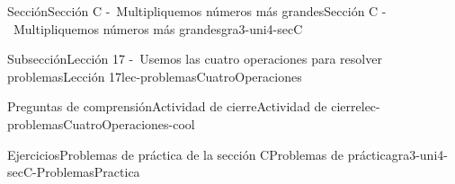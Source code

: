 \begin{sectionptx}{Sección}{Sección C -~Multipliquemos números más grandes}{}{Sección C -~Multipliquemos números más grandes}{}{}{gra3-uni4-secC}
\begin{subsectionptx}{Subsección}{Lección 17 -~Usemos las cuatro operaciones para resolver problemas}{}{Lección 17}{}{}{lec-problemasCuatroOperaciones}
%
%
\typeout{************************************************}
\typeout{************************************************}
%
\begin{reading-questions-subsubsection-numberless}{Preguntas de comprensión}{Actividad de cierre}{}{Actividad de cierre}{}{}{lec-problemasCuatroOperaciones-cool}
%
\end{reading-questions-subsubsection-numberless}
\end{subsectionptx}
%
%
\typeout{************************************************}
\typeout{************************************************}
%
\begin{exercises-subsection}{Ejercicios}{Problemas de práctica de la sección C}{}{Problemas de práctica}{}{}{gra3-uni4-secC-ProblemasPractica}
%
%

\end{exercises-subsection}
\end{sectionptx}
%
%
\typeout{************************************************}
\typeout{************************************************}
%
